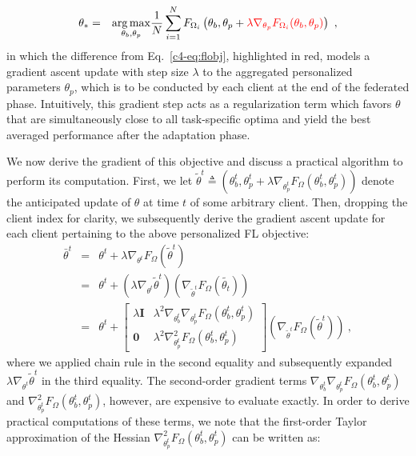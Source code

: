 \begin{eqnarray}
\theta_\ast &=& \underset{\theta_b, \theta_p}{\operatorname{\arg\max}} \frac{1}{N} \sum_{i=1}^N F_{\Omega_i}\left(\theta_b, \theta_p + \textcolor{red}{\lambda \nabla_{\theta_p} F_{\Omega_i}(\theta_b, \theta_p)} \right) \ ,
\label{c4-eq:fedpnasobj}
\end{eqnarray}
in which the difference from Eq.~\eqref{c4-eq:flobj}, highlighted in red, models a gradient ascent update with step size $\lambda$ to the aggregated personalized parameters $\theta_p$, which is to be conducted by each client at the end of the federated phase. Intuitively, this gradient step acts as a regularization term which favors $\theta$ that are simultaneously close to all task-specific optima and yield the best averaged performance after the adaptation phase. 

We now derive the gradient of this objective and discuss a practical algorithm to perform its computation. First, we let $\tilde{\theta}^t \triangleq \left(\theta^t_b, \theta^t_p + \lambda \nabla_{{\theta}^t_p} F_{\Omega}(\theta^t_b, \theta^t_p)\right)$ denote the anticipated update of $\theta$ at time $t$ of some arbitrary client. Then, dropping the client index for clarity, we subsequently derive the gradient ascent update for each client pertaining to the above personalized FL objective:
\begin{eqnarray}
\bar{\theta}^t &=& \theta^t + \lambda \nabla_{\theta^t} F_{\Omega}\left(\tilde{\theta}^t\right)\nonumber \\
&=& \theta^t + \left(\lambda \nabla_{\theta^t}\tilde{\theta}^t \right)\left(\nabla_{\tilde \theta^t} F_{\Omega}(\tilde{\theta_t})\right) \nonumber \\
&=& \theta^t +
\left[
\begin{array}{cc}
     \lambda\mathbf{I} &  \lambda^2 \nabla_{\theta_b^t} \nabla_{\theta_p^t} F_{\Omega}(\theta^t_b, \theta^t_p)\\
     \mathbf{0} & \lambda^2 \nabla^2_{\theta_p^t} F_{\Omega}(\theta^t_b, \theta^t_p)
\end{array}
\right]
\left(\nabla_{\tilde \theta^t} F_{\Omega}(\tilde{\theta}^t)\right) \ ,
\label{c4-eq:fedpnasexactgrad}
\end{eqnarray}
where we applied chain rule in the second equality and subsequently expanded $\lambda \nabla_{\theta^t}\tilde{\theta}^t$ in the third equality. The second-order gradient terms $\nabla_{\theta_b^t} \nabla_{\theta_p^t} F_{\Omega}(\theta^t_b, \theta^t_p)$ and $\nabla^2_{\theta_p^t} F_{\Omega}(\theta^t_b, \theta^t_p)$, however, are expensive to evaluate exactly. In order to derive practical computations of these terms, we note that the first-order Taylor approximation of the Hessian $\nabla^2_{\theta_p^t} F_{\Omega}(\theta^t_b, \theta^t_p)$ can be written as:
